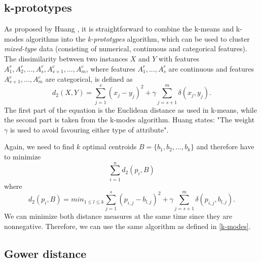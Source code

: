 \subsection{k-prototypes}

As proposed by Huang \cite{kmodes}, it is straightforward to combine the k-means and k-modes algorithms into the \textit{k-prototypes} algorithm, which can be used to cluster \textit{mixed-type} data (consisting of numerical, continuous and categorical features). The dissimilarity between two instances $X$ and $Y$ with features $A^r_1, A^r_2, ..., A^r_s, A_{s+1}^c, ..., A^c_m$, where features $A^r_1, ..., A^r_s$ are continuous and features $A_{s+1}^c, ..., A^c_m$ are categorical, is defined as
$$d_2(X,Y) = \sum^s_{j=1}(x_j - y_j)^2 + \gamma \sum^m_{j=s+1}\delta(x_j, y_j).$$
The first part of the equation is the Euclidean distance as used in k-means, while the second part is taken from the k-modes algorithm. Huang \cite{kmodes} states: "The weight $\gamma$ is used to avoid favouring either type of attribute".

Again, we need to find $k$ optimal centroids $B=\{b_1, b_2, ..., b_k\}$ and therefore have to minimize
$$\sum_{i=1}^n  d_2(p_i, B)$$
where
$$d_2(p_i, B) = min_{1 \leq l \leq k} \sum^s_{j=1}(p_{i,j} - b_{l,j})^2 + \gamma \sum^m_{j=s+1}\delta(p_{i,j}, b_{l,j}).$$
We can minimize both distance measures at the same time since they are nonnegative. Therefore, we can use the same algorithm as defined in \ref{k-modes}. \cite{kmodes}

\subsection{Gower distance}

